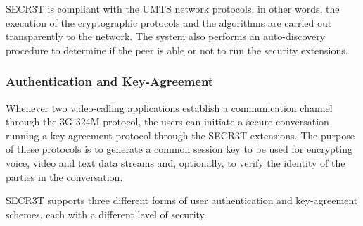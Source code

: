 \documentclass[10pt, conference, compsocconf]{IEEEtran}
\begin{document}
SECR3T is compliant with the UMTS network protocols, in other words, the execution of the cryptographic protocols and the algorithms are carried out transparently to the network. The system also performs an auto-discovery procedure to determine if the peer is able or not to run the security extensions.
\\
\subsubsection{Authentication and Key-Agreement}
\label{par:authka}



Whenever two video-calling applications establish a communication channel through the 3G-324M protocol, the users can initiate a secure conversation running a key-agreement protocol through the SECR3T extensions. The purpose of these protocols is to generate a common session key to be used for encrypting voice, video and text data streams and, optionally, to verify the identity of the parties in the conversation.

\noindent SECR3T supports three different forms of user authentication and key-agreement schemes, each with a different level of security.

\end{document}

